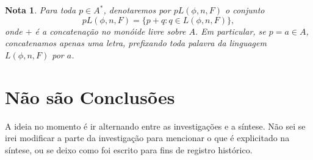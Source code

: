\documentclass[11pt]{article}
\theoremstyle{plain}
\newtheorem{nota}[definicao]{Nota}
\theoremstyle{nonumberplain}
\newcommand{\set}[1]{\{#1\}}
\newcommand{\ainf}{A^*}
\begin{document}
\begin{nota}
    Para toda $p \in \ainf$, denotaremos por $pL(\phi, n, F)$ o conjunto \begin{equation}
        pL(\phi, n, F) = \set { p + q : q \in L(\phi, n, F)},
    \end{equation}
    onde $+$ é a concatenação no monóide livre sobre $A$. Em particular, se $p = a \in A$, concatenamos apenas uma letra, prefixando toda palavra da linguagem $L(\phi, n, F)$ por $a$.
\end{nota}

\section{Não são Conclusões}

A ideia no momento é ir alternando entre as investigações e a síntese. Não sei se irei modificar a parte da investigação para mencionar o que é explicitado na síntese, ou se deixo como foi escrito para fins de registro histórico.
\end{document}

